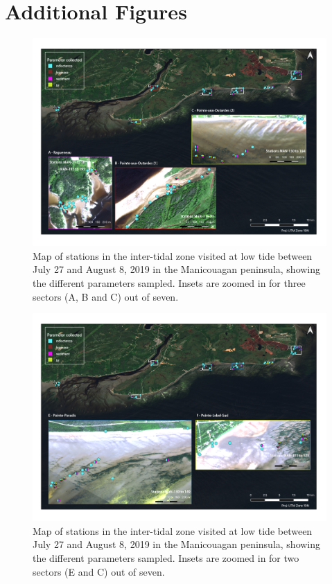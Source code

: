 \documentclass[essd, manuscript]{copernicus}
\begin{document}


\section{Additional Figures}\label{appendixfig}  
\begin{figure}
    \centering
    \includegraphics[width=18cm]{Figures/Fig2a_annexe_intertidal__A_B_C_v2.png}
    \caption{Map of stations in the inter-tidal zone visited at low tide between July 27 and August 8, 2019 in the Manicouagan peninsula, showing the different parameters sampled. Insets are zoomed in for three sectors (A, B and C) out of seven. }
    \label{fig:intertidal1_annexe}
    
\end{figure}

\begin{figure}
    \centering
    \includegraphics[width=18cm]{Figures/Fig2b_annexe_intertidal_E_F_v2.png}
    \caption{Map of stations in the inter-tidal zone visited at low tide between July 27 and August 8, 2019 in the Manicouagan peninsula, showing the different parameters sampled. Insets are zoomed in for two sectors (E and C) out of seven. }
    \label{fig:intertidal2_annexe}
\end{figure}
\end{document}
